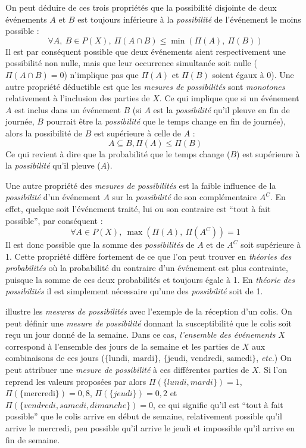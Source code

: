 On peut déduire de ces trois propriétés \autocite{Bouchon-Meunier2007}
que la possibilité disjointe de deux événements \(A\) et \(B\) est
toujours inférieure à la \emph{possibilité} de l'événement le moins
possible :
%
\begin{equation}
  ∀ A,\ B ∈ P(X),\ Π(A ∩ B) ≤ \min(Π(A),\ Π(B))
\end{equation}
%
Il est par conséquent possible que deux événements aient
respectivement une possibilité non nulle, mais que leur occurrence
simultanée soit nulle (\( Π(A ∩ B) = 0\)) n'implique pas que \(Π(A)\)
et \(Π(B)\) soient égaux à 0). Une autre propriété déductible est que
les \emph{mesures de possibilités} sont \emph{monotones} relativement
à l'inclusion des parties de \(X\). Ce qui implique que si un
événement \(A\) est inclus dans un événement \(B\) (\eg si \(A\) est
la \emph{possibilité} qu'il pleuve en fin de journée, \(B\) pourrait
être la \emph{possibilité} que le temps change en fin de journée),
alors la possibilité de \(B\) est supérieure à celle de \(A\) :
%
\begin{equation}
  A \subseteq B, Π(A) ≤ Π(B)
\end{equation}
%
Ce qui revient à dire que la probabilité que le temps change (\(B\))
est supérieure à la \emph{possibilité} qu'il pleuve (\(A\)).

Une autre propriété des \emph{mesures de possibilités} est la faible
influence de la \emph{possibilité} d'un événement \(A\) sur la
\emph{possibilité} de son complémentaire \(A^C\). En effet, quelque
soit l’événement traité, lui ou son contraire est \enquote{tout à fait
  possible}, par conséquent :
%
\begin{equation}
  ∀ A ∈ P(X),\ \max(Π(A),\ Π(A^C)) = 1  
\end{equation}
%
Il est donc possible que la somme des \emph{possibilités} de \(A\) et
de \(A^C\) soit supérieure à 1. Cette propriété diffère fortement de
ce que l'on peut trouver en \emph{théories des probabilités} où la
probabilité du contraire d'un événement est plus contrainte, puisque
la somme de ces deux probabilités et toujours égale à 1. En
\emph{théorie des possibilités} il est simplement nécessaire qu'une
des \emph{possibilité} soit de 1.

\textcite{Bouchon-Meunier1995} illustre les \emph{mesures de
  possibilités} avec l'exemple de la réception d'un colis. On peut
définir une \emph{mesure de possibilité} donnant la susceptibilité que
le colis soit reçu un jour donné de la semaine. Dans ce cas,
\emph{l'ensemble des événements} \(X\) correspond à l'ensemble des
jours de la semaine et les parties de \(X\) aux combinaisons de ces
jours (\eg \(\{\text{lundi},\ \text{mardi}\}\),
\(\{\text{jeudi, vendredi, samedi}\}\), \emph{etc.})  On peut
attribuer une \emph{mesure de possibilité} à ces différentes parties
de \(X\). Si l'on reprend les valeurs proposées par
\textcite{Bouchon-Meunier1995} alors \(\Pi(\{lundi, mardi\})=1\),
\(\Pi(\{\text{mercredi}\})=0,8\), \(\Pi(\{jeudi\})=0,2\) et
\(\Pi(\{vendredi, samedi, dimanche\})=0\), ce qui signifie qu'il est
\enquote{tout à fait possible} que le colis arrive en début de
semaine, relativement possible qu'il arrive le mercredi, peu possible
qu'il arrive le jeudi et impossible qu'il arrive en fin de semaine.

